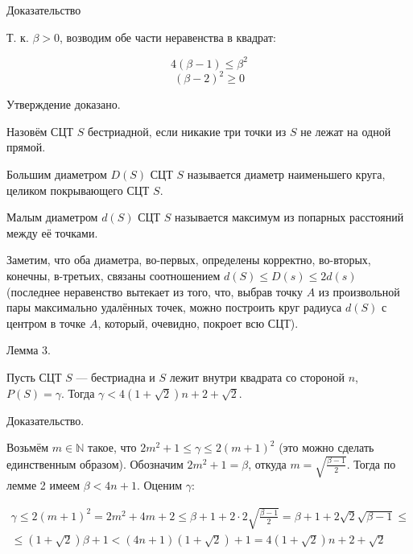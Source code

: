 \documentclass[a4paper,14pt]{article}
\begin{document}
Доказательство

Т. к. $\beta >0$, возводим обе части неравенства в квадрат:

$$4 (\beta - 1) \leq \beta^2$$
$$ (\beta-2)^2 \geq 0$$

Утверждение доказано.

\begin{opr}

Назовём СЦТ $S$ бестриадной, если никакие три точки из $S$ не лежат на одной прямой.

\end{opr}

\begin{opr}

Большим диаметром $D(S)$ СЦТ $S$ называется диаметр наименьшего круга, целиком покрывающего СЦТ $S$.

\end{opr}

\begin{opr}

Малым диаметром $d(S)$ СЦТ $S$ называется максимум из попарных расстояний между её точками.

\end{opr}

Заметим, что оба диаметра, во-первых, определены корректно, во-вторых, конечны, в-третьих, связаны соотношением $d(S)\leq D(s) \leq 2d(s)$ (последнее неравенство вытекает из того, что, выбрав точку $A$ из произвольной пары максимально удалённых точек, можно построить круг радиуса $d(S)$ с центром в точке $A$, который, очевидно, покроет всю СЦТ).


Лемма 3.

Пусть СЦТ $S$ --- бестриадна и $S$ лежит внутри квадрата со стороной $n$, $P(S)=\gamma$.
Тогда $\gamma<4(1+\sqrt{2})n+2+\sqrt{2}$.

Доказательство.

Возьмём $m \in \mathbb{N}$ такое, что $2m^2+1 \le \gamma \le 2(m+1)^2$ (это можно сделать единственным образом).
Обозначим $2m^2+1=\beta$, откуда $m=\sqrt{\frac{\beta-1}{2}}$. Тогда по лемме 2 имеем $ \beta < 4n +1$. Оценим $\gamma$:

\begin{multline}
\gamma \le 2(m+1)^2 = 2m^2+4m +2 \leq
\beta + 1 + 2 \cdot 2 \sqrt{\frac{\beta-1}{2}} =
\beta + 1 +2\sqrt{2}\sqrt{\beta-1} \leq
\\ \leq
(1+\sqrt{2})\beta+1 <
(4n+1)(1+\sqrt{2})+1 =
4(1+\sqrt{2})n+2+\sqrt{2}
\end{multline}
\end{document}
